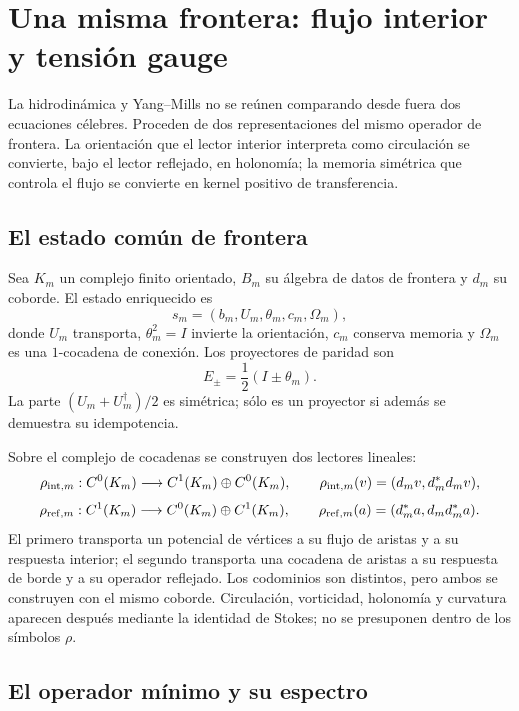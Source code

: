 \chapter{Una misma frontera: flujo interior y tensión gauge}
\label{chap:hoja-comun-ns-ym}

La hidrodinámica y Yang--Mills no se reúnen comparando desde fuera dos
ecuaciones célebres. Proceden de dos representaciones del mismo operador de
frontera. La orientación que el lector interior interpreta como circulación
se convierte, bajo el lector reflejado, en holonomía; la memoria simétrica
que controla el flujo se convierte en kernel positivo de transferencia.

\section{El estado común de frontera}

Sea \(K_m\) un complejo finito orientado, \(B_m\) su álgebra de datos de
frontera y \(d_m\) su coborde. El estado enriquecido es
\[
 s_m=(b_m,U_m,\theta_m,c_m,\Omega_m),
\]
donde \(U_m\) transporta, \(\theta_m^2=I\) invierte la orientación,
\(c_m\) conserva memoria y \(\Omega_m\) es una \(1\)-cocadena de conexión.
Los proyectores de paridad son
\[
 E_\pm=\frac12(I\pm\theta_m).
\]
La parte \((U_m+U_m^\dagger)/2\) es simétrica; sólo es un proyector si además
se demuestra su idempotencia.

Sobre el complejo de cocadenas se construyen dos lectores lineales:
\[
 \rho_{{\rm int},m}:C^0(K_m)\longrightarrow
 C^1(K_m)\oplus C^0(K_m),
\qquad
 \rho_{{\rm int},m}(v)=(d_mv,d_m^\ast d_mv),
\]
\[
 \rho_{{\rm ref},m}:C^1(K_m)\longrightarrow
 C^0(K_m)\oplus C^1(K_m),
\qquad
 \rho_{{\rm ref},m}(a)=(d_m^\ast a,d_md_m^\ast a).
\]
El primero transporta un potencial de vértices a su flujo de aristas y a su
respuesta interior; el segundo transporta una cocadena de aristas a su
respuesta de borde y a su operador reflejado. Los codominios son distintos,
pero ambos se construyen con el mismo coborde. Circulación, vorticidad,
holonomía y curvatura aparecen después mediante la identidad de Stokes; no
se presuponen dentro de los símbolos \(\rho\).

\section{El operador mínimo y su espectro}

